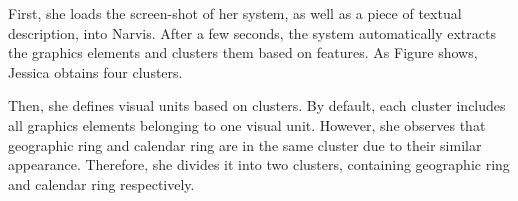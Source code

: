 
First, she loads the screen-shot of her system, as well as a piece of textual description, into Narvis.
After a few seconds, the system automatically extracts the graphics elements and clusters them based on features. As Figure shows, Jessica obtains four clusters. 

Then, she defines visual units based on clusters. By default, each cluster includes all graphics elements belonging to one visual unit. However, she observes that geographic ring and calendar ring are in the same cluster due to their similar appearance. Therefore, she divides it into two clusters, containing geographic ring and calendar ring respectively.

